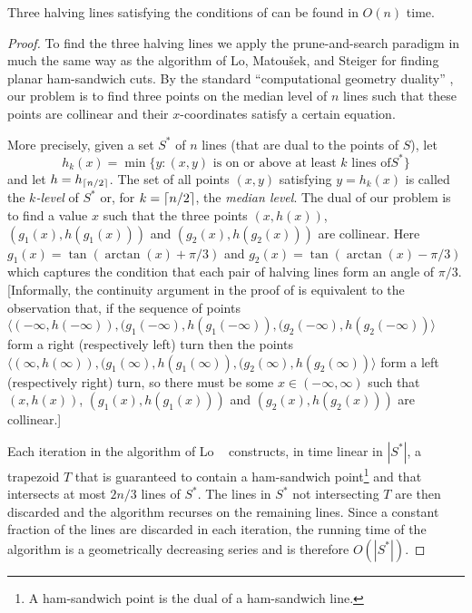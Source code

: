 \documentclass{dmtcs}
\newcommand{\blau}[1]{\tan(\arctan(#1)+\pi/3)}
\newcommand{\bleu}[1]{\tan(\arctan(#1)-\pi/3)}
\begin{document}
\begin{lem}
Three halving lines satisfying the conditions of 
can be found in $O(n)$ time.
\end{lem}

\begin{proof}

To find the three halving lines we apply the prune-and-search paradigm
in much the same way as the algorithm of Lo, Matou\v{s}ek, and Steiger
\cite{lms94} for finding planar ham-sandwich cuts.  By the standard
``computational geometry duality'' \cite[Section~1.3.3]{bkoo97}, our problem
is to find three points on the median level of $n$ lines such that
these points are collinear and their $x$-coordinates satisfy a certain
equation.  

More precisely, given a set $S^*$ of $n$ lines (that are dual to the
points of $S$), let
\[
    h_k(x) = \min\{ y : 
        \mbox{$(x,y)$ is on or above at least $k$ lines of
$S^*$}\} 
\]
and let $h=h_{\left\lceil n/2 \right\rceil}$.  The set of all points $(x,y)$ satisfying
$y=h_k(x)$ is called the \emph{$k$-level} of $S^*$ or, for
$k=\left\lceil n/2 \right\rceil$, the \emph{median level}.
The dual of our problem is to find a value $x$ such that the three points
$(x,h(x))$, $(g_1(x),h(g_1(x)))$ and $(g_2(x),h(g_2(x)))$ are collinear.
Here $g_1(x)=\blau{x}$ and
$g_2(x)=\bleu{x}$ which captures the condition that each pair of halving
lines form an angle of $\pi/3$.  [Informally, the continuity argument in
the proof of  is equivalent to the observation
that, if the sequence of points $\langle(-\infty,h(-\infty)),
(g_1(-\infty),h(g_1(-\infty)), (g_2(-\infty),h(g_2(-\infty))\rangle$ form
a right (respectively left) turn then the points $\langle(\infty,h(\infty)),
(g_1(\infty),h(g_1(\infty)), (g_2(\infty),h(g_2(\infty))\rangle$ form a
left (respectively right) turn, so there must be some
$x\in(-\infty,\infty)$ such that 
$(x,h(x))$, $(g_1(x),h(g_1(x)))$ and $(g_2(x),h(g_2(x)))$ are
collinear.]

Each iteration in the algorithm of Lo \etal\ \cite{lms94} constructs,
in time linear in $|S^*|$, a trapezoid $T$ that is guaranteed to
contain a ham-sandwich point\footnote{A ham-sandwich point is the dual
of a ham-sandwich line.} and that intersects at most $2n/3$ lines
of $S^*$.  The lines in $S^*$ not intersecting $T$ are then discarded
and the algorithm recurses on the remaining lines.  Since a constant
fraction of the lines are discarded in each iteration, the running
time of the algorithm is a geometrically decreasing series and is
therefore $O(|S^*|)$.


\end{proof}
\end{document}
